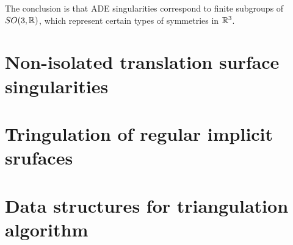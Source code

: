 The conclusion is that ADE singularities correspond to finite subgroups of
$SO(3, \mathbb{R})$, which represent certain types of symmetries in $\mathbb{R}^3$.

\section{Non-isolated translation surface singularities}
\label{sub2.3}

\section{Tringulation of regular implicit srufaces}
\label{sub2.4}

\section{Data structures for triangulation algorithm}
\label{sub2.5}
